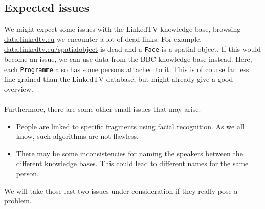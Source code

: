 \documentclass[12pt,a4paper]{article}
\begin{document}
\subsection*{Expected issues}
We might expect some issues with the LinkedTV knowledge base, browsing \url{data.linkedtv.eu} we encounter a lot of dead links. For example, \url{data.linkedtv.eu/spatialobject} is dead and a \texttt{Face} is a spatial object. If this would become an issue, we can use data from the BBC knowledge base instead. Here, each \texttt{Programme} also has some persons attached to it. This is of course far less fine-grained than the LinkedTV database, but might already give a good overview.
\\
\\
Furthermore, there are some other small issues that may arise:
\begin{itemize}
	\item People are linked to specific fragments using facial recognition. As we all know, such algorithms are not flawless.
	\item There may be some inconsistencies for naming the speakers between the different knowledge bases. This could lead to different names for the same person.
\end{itemize}

We will take those last two issues under consideration if they really pose a problem.
\end{document}
